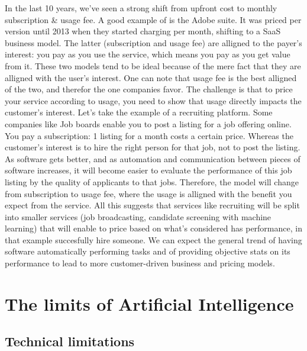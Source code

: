 \documentclass[12pt]{article}
\begin{document}
{In the last 10 years, we've seen a strong shift from upfront cost to monthly
subscription \& usage fee. A good example of is the Adobe suite. It was priced
per version until 2013 when they started charging per month, shifting to a SaaS
business model.
The latter (subscription and usage fee) are alligned to the payer's interest:
you pay as you use the service, which means you pay as you get value from it.
These two models tend to be ideal because of the mere fact that they are alligned
with the user's interest. One can note that usage fee is the best alligned of
the two, and therefor the one companies favor.
The challenge is that to price your service according to usage, you need to show
that usage directly impacts the customer's interest. Let's take the example of a
recruiting platform. Some companies like Job boards enable you to post a listing
for a job offering online. You pay a subscription: 1 listing for a month costs a
certain price. Whereas the customer's interest is to hire the right person for
that job, not to post the listing. As software gets better, and as automation and
communication between pieces of software increases, it will become easier to
evaluate the performance of this job listing by the quality of applicants to
that jobs. Therefore, the model will change from subscription to usage fee, where
the usage is alligned with the benefit you expect from the service.
All this suggests that services like recruiting will be split into smaller
services (job broadcasting, candidate screening with machine learning) that will
enable to price based on what's considered has performance, in that example
succesfully hire someone. We can expect the general trend of having software
automatically performing tasks and of providing objective stats on its performance
to lead to more customer-driven business and pricing models.

\pagebreak


\section{The limits of Artificial Intelligence}

\subsection{Technical limitations}

}
\end{document}
